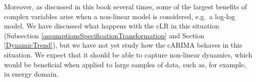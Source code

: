 \documentclass[
]{book}
\begin{document}
Moreover, as discussed in this book several times, some of the largest benefits of complex variables arise when a non-linear model is considered, e.g.~a log-log model. We have discussed what happens with the cLR in this situation (Subsection \ref{assumptionsSpecificationTransformation} and Section \ref{DynamicTrend}), but we have not yet study how the cARIMA behaves in this situation. We expect that it should be able to capture non-linear dynamics, which would be beneficial when applied to large samples of data, such as, for example, in energy domain.

  
\end{document}
